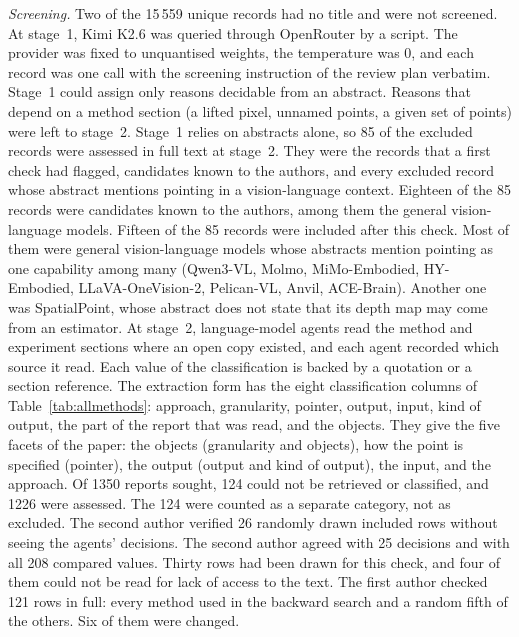 \emph{Screening.}
Two of the 15\,559 unique records had no title and were not screened.
At stage~1, Kimi K2.6 was queried through OpenRouter by a script.
The provider was fixed to unquantised weights, the temperature was 0, and each record was one call with the screening instruction of the review plan verbatim.
Stage~1 could assign only reasons decidable from an abstract.
Reasons that depend on a method section (a lifted pixel, unnamed points, a given set of points) were left to stage~2.
Stage~1 relies on abstracts alone, so 85 of the excluded records were assessed in full text at stage~2.
They were the records that a first check had flagged, candidates known to the authors, and every excluded record whose abstract mentions pointing in a vision-language context.
Eighteen of the 85 records were candidates known to the authors, among them the general vision-language models.
Fifteen of the 85 records were included after this check.
Most of them were general vision-language models whose abstracts mention pointing as one capability among many (Qwen3-VL, Molmo, MiMo-Embodied, HY-Embodied, LLaVA-OneVision-2, Pelican-VL, Anvil, ACE-Brain).
Another one was SpatialPoint, whose abstract does not state that its depth map may come from an estimator.
At stage~2, language-model agents read the method and experiment sections where an open copy existed, and each agent recorded which source it read.
Each value of the classification is backed by a quotation or a section reference.
The extraction form has the eight classification columns of Table~\ref{tab:allmethods}: approach, granularity, pointer, output, input, kind of output, the part of the report that was read, and the objects.
They give the five facets of the paper: the objects (granularity and objects), how the point is specified (pointer), the output (output and kind of output), the input, and the approach.
Of 1350 reports sought, 124 could not be retrieved or classified, and 1226 were assessed.
The 124 were counted as a separate category, not as excluded.
The second author verified 26 randomly drawn included rows without seeing the agents' decisions.
The second author agreed with 25 decisions and with all 208 compared values.
Thirty rows had been drawn for this check, and four of them could not be read for lack of access to the text.
The first author checked 121 rows in full: every method used in the backward search and a random fifth of the others.
Six of them were changed.

